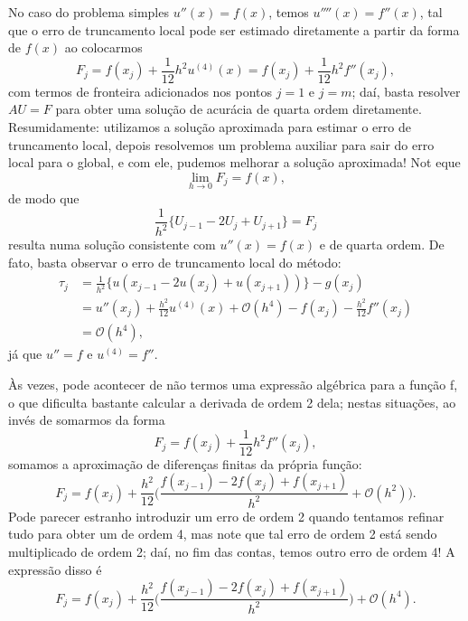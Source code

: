 \documentclass[../differential_methods.tex]{subfiles}
\begin{document}
No caso do problema simples \(u''(x)=f(x)\), temos \(u''''(x) = f''(x)\), tal que o erro de truncamento local pode ser estimado diretamente a partir da forma de \(f(x)\) ao colocarmos
\[
	F_{j}= f(x_{j})+\frac{1}{12}h^{2}u^{(4)}(x)=f(x_{j})+\frac{1}{12}h^{2}f''(x_{j}),
\]
com termos de fronteira adicionados nos pontos \(j=1\) e \(j=m\); daí, basta resolver \(AU=F\) para obter uma solução de acurácia de quarta ordem diretamente. Resumidamente: utilizamos a solução aproximada para estimar o erro de truncamento local, depois resolvemos um problema auxiliar para sair do erro local para o global, e com ele, pudemos melhorar a solução aproximada! Not eque
\[
	\lim_{h\to 0}F_{j} = f(x),
\]
de modo que
\[
	\frac{1}{h^{2}}\biggl\{U_{j-1}-2U_{j}+U_{j+1}\biggr\} = F_{j}
\]
resulta numa solução consistente com \(u''(x)=f(x)\) e de quarta ordem.
De fato, basta observar o erro de truncamento local do método:
\begin{align*}
	\tau_{j} & =\frac{1}{h^{2}}\biggl\{u(x_{j-1}-2u(x_{j})+u(x_{j+1}))\biggr\}-g(x_{j})                      \\
	         & =u''(x_{j})+\frac{h^{2}}{12}u^{(4)}(x)+\mathcal{O}(h^{4})-f(x_{j})-\frac{h^{2}}{12}f''(x_{j}) \\
	         & = \mathcal{O}(h^{4}),
\end{align*}
já que \(u''=f\) e \(u^{(4)}=f''\).

Às vezes, pode acontecer de não termos uma expressão algébrica para a função f, o que dificulta bastante calcular a derivada de ordem 2 dela; nestas situações, ao invés de somarmos da forma
\[
	F_{j}=f(x_{j})+\frac{1}{12}h^{2}f''(x_{j}),
\]
somamos a aproximação de diferenças finitas da própria função:
\[
	F_{j}=f(x_{j})+\frac{h^{2}}{12}\biggl(\frac{f(x_{j-1})-2f(x_{j})+f(x_{j+1})}{h^{2}} + \mathcal{O}(h^{2})\biggr).
\]
Pode parecer estranho introduzir um erro de ordem 2 quando tentamos refinar tudo para obter um de ordem 4, mas note que tal erro de ordem 2 está sendo multiplicado de ordem 2; daí, no fim das contas, temos outro erro de ordem 4! A expressão disso é
\[
	F_{j}=f(x_{j})+\frac{h^{2}}{12}\biggl(\frac{f(x_{j-1})-2f(x_{j})+f(x_{j+1})}{h^{2}}\biggr) + \mathcal{O}(h^{4}).
\]
\end{document}
